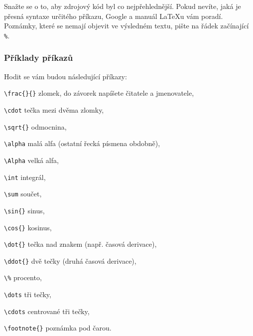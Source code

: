 \documentclass[fykos]{fksbase} %
\begin{document}
Snažte se o to, aby zdrojový kód byl co nejpřehlednější. Pokud nevíte, jaká je
přesná syntaxe určitého příkazu,
Google a manuál {\LaTeX}u vám poradí. Poznámky, které se nemají objevit ve
výsledném textu, pište na řádek začínající \verb|%|.

\subsubsection{Příklady příkazů}

Hodit se vám budou následující příkazy:
\begin{multicols}{2}
\begin{compactitem}
    \item \verb|\frac{}{}| zlomek, do závorek napíšete čitatele a jmenovatele,
    \item \verb|\cdot| tečka mezi dvěma zlomky,
    \item \verb|\sqrt{}| odmocnina,
    \item \verb|\alpha| malá alfa (ostatní řecká písmena obdobně),
    \item \verb|\Alpha| velká alfa,
    \item \verb|\int| integrál,
    \item \verb|\sum| součet,
    \item \verb|\sin{}| sinus,
    \item \verb|\cos{}| kosinus,
    \item \verb|\dot{}| tečka nad znakem (např. časová derivace),
    \item \verb|\ddot{}| dvě tečky (druhá časová derivace),
    \item \verb|\%| procento,
    \item \verb|\dots| tři tečky,
    \item \verb|\cdots| centrované tři tečky,
    \item \verb|\footnote{}| poznámka pod čarou.
\end{compactitem} 
\end{multicols}
\end{document}
